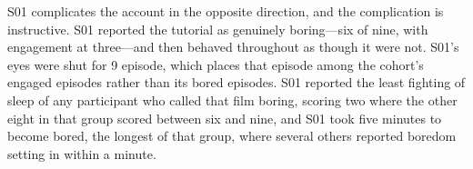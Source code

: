 
S01 complicates the account in the opposite direction, and the complication is
instructive. S01 reported the tutorial as genuinely boring---six of nine, with engagement at
three---and then behaved throughout as though it were not. S01's eyes were shut for 9%
episode, which places that episode among the cohort's engaged episodes rather than its bored episodes. S01 reported the least fighting of sleep of any participant who called that film boring,
scoring two where the other eight in that group scored between six and nine, and S01 took five
minutes to become bored, the longest of that group, where several others reported boredom
setting in within a minute.


